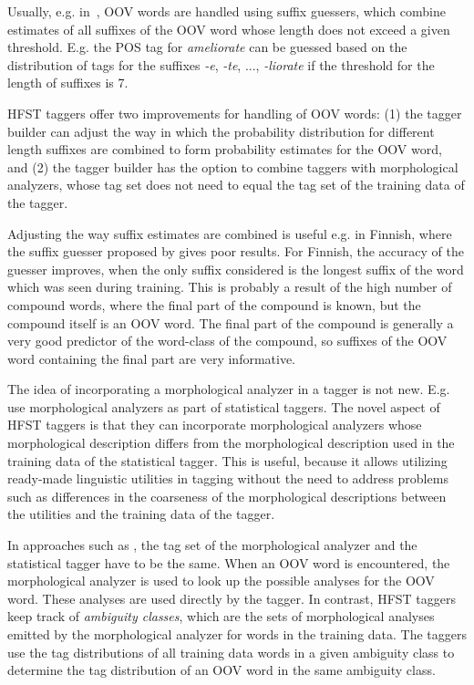 \documentclass[draft]{llncs}
\begin{document}
Usually, e.g. in~\cite{Brants:2000}, OOV words are handled using
suffix guessers, which combine estimates of all suffixes of the OOV
word whose length does not exceed a given threshold. E.g. the POS tag
for {\it ameliorate} can be guessed based on the distribution of tags
for the suffixes {\it -e}, {\it -te}, ..., {\it -liorate} if the
threshold for the length of suffixes is 7.

HFST taggers offer two improvements for handling of OOV words: (1) the
tagger builder can adjust the way in which the probability
distribution for different length suffixes are combined to form
probability estimates for the OOV word, and (2) the tagger builder has
the option to combine taggers with morphological analyzers, whose tag
set does not need to equal the tag set of the training data of
the tagger.

Adjusting the way suffix estimates are combined is useful e.g. in
Finnish, where the suffix guesser proposed by \cite{Brants:2000} gives
poor results. For Finnish, the accuracy of the guesser improves, when
the only suffix considered is the longest suffix of the word which was
seen during training. This is probably a result of the high number of
compound words, where the final part of the compound is known, but the
compound itself is an OOV word. The final part of the compound is
generally a very good predictor of the word-class of the compound, so
suffixes of the OOV word containing the final part are very
informative.

The idea of incorporating a morphological analyzer in a tagger is not
new. E.g.  \cite{Tzoukerman:1996,Oravecz:2002} use morphological
analyzers as part of statistical taggers. The novel aspect of HFST
taggers is that they can incorporate morphological analyzers whose
morphological description differs from the morphological description
used in the training data of the statistical tagger. This is useful,
because it allows utilizing ready-made linguistic utilities in tagging
without the need to address problems such as differences in the
coarseness of the morphological descriptions between the utilities and
the training data of the tagger.

In approaches such as \cite{Tzoukerman:1996,Oravecz:2002}, the tag set
of the morphological analyzer and the statistical tagger have to be
the same. When an OOV word is encountered, the morphological analyzer
is used to look up the possible analyses for the OOV word. These
analyses are used directly by the tagger. In contrast, HFST taggers
keep track of {\it ambiguity classes}, which are the sets of
morphological analyses emitted by the morphological analyzer for words
in the training data. The taggers use the tag distributions of all
training data words in a given ambiguity class to determine the tag
distribution of an OOV word in the same ambiguity class.
\end{document}
